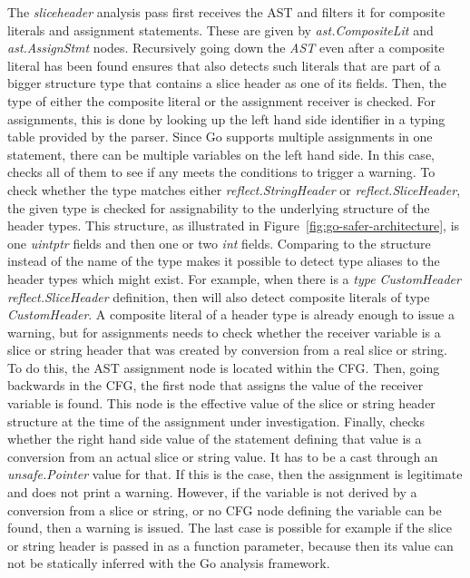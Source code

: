 The \textit{sliceheader} analysis pass first receives the \acrshort{AST} and filters it for composite literals and
assignment statements.
These are given by \textit{ast.CompositeLit} and \textit{ast.AssignStmt} nodes.
Recursively going down the \textit{AST} even after a composite literal has been found ensures that \toolSafer{} also
detects such literals that are part of a bigger structure type that contains a slice header as one of its fields.
Then, the type of either the composite literal or the assignment receiver is checked.
For assignments, this is done by looking up the left hand side identifier in a typing table provided by the parser.
Since Go supports multiple assignments in one statement, there can be multiple variables on the left hand side.
In this case, \toolSafer{} checks all of them to see if any meets the conditions to trigger a warning.
To check whether the type matches either \textit{reflect.StringHeader} or \textit{reflect.SliceHeader}, the given type
is checked for assignability to the underlying structure of the header types.
This structure, as illustrated in Figure~\ref{fig:go-safer-architecture}, is one \textit{uintptr} fields and then one
or two \textit{int} fields.
Comparing to the structure instead of the name of the type makes it possible to detect type aliases to the header types
which might exist.
For example, when there is a \textit{type CustomHeader reflect.SliceHeader} definition, then \toolSafer{} will also
detect composite literals of type \textit{CustomHeader}.
A composite literal of a header type is already enough to issue a warning, but for assignments \toolSafer{} needs to
check whether the receiver variable is a slice or string header that was created by conversion from a real slice or
string.
To do this, the \acrshort{AST} assignment node is located within the \acrshort{CFG}.
Then, going backwards in the \acrshort{CFG}, the first node that assigns the value of the receiver variable is found.
This node is the effective value of the slice or string header structure at the time of the assignment under
investigation.
Finally, \toolSafer{} checks whether the right hand side value of the statement defining that value is a conversion
from an actual slice or string value.
It has to be a cast through an \textit{unsafe.Pointer} value for that.
If this is the case, then the assignment is legitimate and \toolSafer{} does not print a warning.
However, if the variable is not derived by a conversion from a slice or string, or no \acrshort{CFG} node defining the
variable can be found, then a warning is issued.
The last case is possible for example if the slice or string header is passed in as a function parameter, because then
its value can not be statically inferred with the Go analysis framework.

